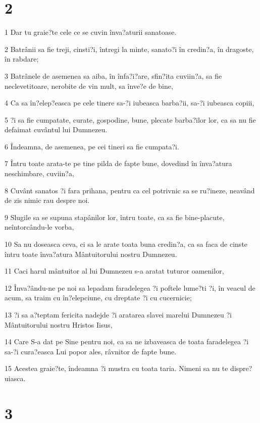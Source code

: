 \chapter{2}

\par 1 Dar tu graie?te cele ce se cuvin înva?aturii sanatoase.
\par 2 Batrânii sa fie treji, cinsti?i, întregi la minte, sanato?i în credin?a, în dragoste, în rabdare;
\par 3 Batrânele de asemenea sa aiba, în înfa?i?are, sfin?ita cuviin?a, sa fie neclevetitoare, nerobite de vin mult, sa înve?e de bine,
\par 4 Ca sa în?elep?easca pe cele tinere sa-?i iubeasca barba?ii, sa-?i iubeasca copiii,
\par 5 ?i sa fie cumpatate, curate, gospodine, bune, plecate barba?ilor lor, ca sa nu fie defaimat cuvântul lui Dumnezeu.
\par 6 Îndeamna, de asemenea, pe cei tineri sa fie cumpata?i.
\par 7 Întru toate arata-te pe tine pilda de fapte bune, dovedind în înva?atura neschimbare, cuviin?a,
\par 8 Cuvânt sanatos ?i fara prihana, pentru ca cel potrivnic sa se ru?ineze, neavând de zis nimic rau despre noi.
\par 9 Slugile sa se supuna stapânilor lor, întru toate, ca sa fie bine-placute, neîntorcându-le vorba,
\par 10 Sa nu doseasca ceva, ci sa le arate toata buna credin?a, ca sa faca de cinste întru toate înva?atura Mântuitorului nostru Dumnezeu.
\par 11 Caci harul mântuitor al lui Dumnezeu s-a aratat tuturor oamenilor,
\par 12 Înva?ându-ne pe noi sa lepadam faradelegea ?i poftele lume?ti ?i, în veacul de acum, sa traim cu în?elepciune, cu dreptate ?i cu cucernicie;
\par 13 ?i sa a?teptam fericita nadejde ?i aratarea slavei marelui Dumnezeu ?i Mântuitorului nostru Hristos Iisus,
\par 14 Care S-a dat pe Sine pentru noi, ca sa ne izbaveasca de toata faradelegea ?i sa-?i cura?easca Lui popor ales, râvnitor de fapte bune.
\par 15 Acestea graie?te, îndeamna ?i mustra cu toata taria. Nimeni sa nu te dispre?uiasca.

\chapter{3}

